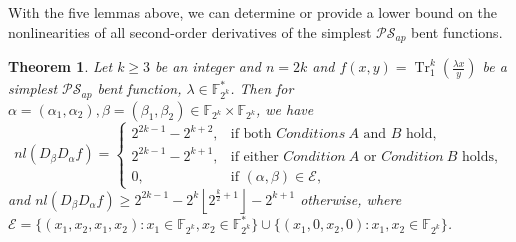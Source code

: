 \documentclass[preprint,10pt]{elsarticle}
\newcommand{\F}{\mathbb{F}}
\newcommand{\0}{\textbf{0}}
\newcommand{\1}{\textbf{1}}
\newcommand{\TRACE}{\operatorname{Tr}_1^k}
\theoremstyle{plain}
\newtheorem{theorem}{Theorem}
\begin{document}
    With the five lemmas above, we can determine or provide a lower bound on the nonlinearities of all second-order derivatives of the simplest $\mathcal{PS}_{ap}$ bent functions.
    \begin{theorem}\label{thm:nl_DaDbf}
        Let $k\ge 3$ be an integer and $n=2k$ and $f(x,y)=\TRACE\left(\frac{\lambda x}{y}\right)$ be a simplest $\mathcal{PS}_{ap}$ bent function, $\lambda\in\F_{2^k}^*$.
        Then for $\alpha=(\alpha_1,\alpha_2),\beta=(\beta_1,\beta_2)\in\F_{2^k}\times\F_{2^k}$, we have
        \begin{equation}\label{res:nontrivil_nl}
            nl(D_{\beta}D_{\alpha}f)=\begin{cases}
                2^{2k-1}-2^{k+2},&\text{if both }\hyperref[item_a]{{Conditions~A}}\text{ and }\hyperref[item_b]{{B}} \text{ hold},\\
                2^{2k-1}-2^{k+1},&\text{if either }\hyperref[item_a]{{Condition~A}}\text{ or }\hyperref[item_b]{Condition~B}\text{ holds},\\
                0,&\text{if }(\alpha,\beta)\in \mathcal{E},%
            \end{cases}
        \end{equation}
        and $nl(D_{\beta}D_{\alpha}f)\ge 2^{2k-1}-2^k\left\lfloor 2^{\frac{k}{2}+1}\right\rfloor-2^{k+1}$ otherwise,
        where $\mathcal{E}=\{(x_1,x_2,x_1,x_2):x_1\in\F_{2^k},x_2\in\F_{2^k}^*\}\cup\{(x_1,0,x_2,0):x_1,x_2\in\F_{2^k}\}$.
    \end{theorem}
\end{document}
